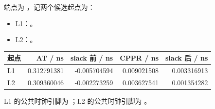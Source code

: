 端点为 ，记两个候选起点为：
\begin{itemize}
\item L1：。
\item L2：。
\end{itemize}
\begin{center}\small
\begin{tabular}{lrrrr}
\toprule
起点 & AT / ns & slack 前 / ns & CPPR / ns & slack 后 / ns \\
\midrule
L1 & 0.312791381 & -0.005704594 & 0.009021508 & 0.003316913 \\
L2 & 0.309360046 & -0.002273259 & 0.003627541 & 0.001354282 \\
\bottomrule
\end{tabular}
\end{center}
L1 的公共时钟引脚为 ；L2 的公共时钟引脚为 。
